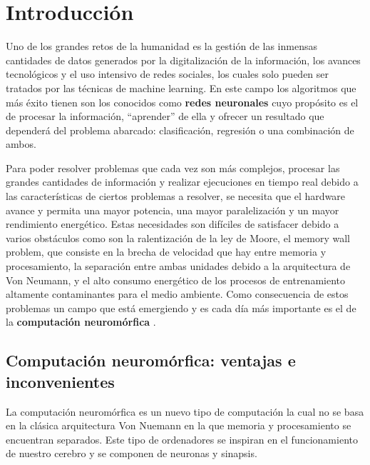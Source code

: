\chapter{Introducción}
Uno de los grandes retos de la humanidad es la gestión de las inmensas cantidades de datos generados por la digitalización de la información, los avances tecnológicos y el uso intensivo de redes sociales, los cuales solo pueden ser tratados por las técnicas de machine learning. En este campo los algoritmos que más éxito tienen son los conocidos como \textbf{redes neuronales} cuyo propósito es el de procesar la información, ``aprender'' de ella y ofrecer un resultado que dependerá del problema abarcado: clasificación, regresión o una combinación de ambos. 

Para poder resolver problemas que cada vez son más complejos, procesar las grandes cantidades de información y realizar ejecuciones en tiempo real debido a las características de ciertos problemas a resolver, se necesita que el hardware avance y permita una mayor potencia, una mayor paralelización y un mayor rendimiento energético. Estas necesidades son difíciles de satisfacer debido a varios obstáculos como son la ralentización de la ley de Moore, el memory wall problem, que consiste en la brecha de velocidad que hay entre memoria y procesamiento, la separación entre ambas unidades debido a la arquitectura de Von Neumann, y el alto consumo energético de los procesos de entrenamiento altamente contaminantes para el medio ambiente. Como consecuencia de estos problemas un campo que está emergiendo y es cada día más importante es el de la \textbf{computación neuromórfica} \cite{RefWorks:RefID:4-schuman2022opportunities}. 

\section{Computación neuromórfica: ventajas e inconvenientes}
La computación neuromórfica es un nuevo tipo de computación la cual no se basa en la clásica arquitectura Von Nuemann en la que memoria y procesamiento se encuentran separados. Este tipo de ordenadores se inspiran en el funcionamiento de nuestro cerebro y se componen de neuronas y sinapsis. 

